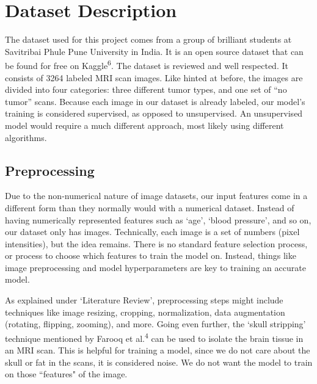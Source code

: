 \documentclass[conference]{IEEEtran}
\begin{document}
\section{\large Dataset Description}

The dataset used for this project comes from a group of brilliant students at Savitribai Phule Pune University in India. It is an open source dataset that can be found for free on Kaggle\textsuperscript{6}. The dataset is reviewed and well respected. It consists of 3264 labeled MRI scan images. Like hinted at before, the images are divided into four categories: three different tumor types, and one set of “no tumor” scans. Because each image in our dataset is already labeled, our model's training is considered supervised, as opposed to unsupervised. An unsupervised model would require a much different approach, most likely using different algorithms.

\subsection{\large Preprocessing}

Due to the non-numerical nature of image datasets, our input features come in a different form than they normally would with a numerical dataset. Instead of having numerically represented features such as `age', `blood pressure', and so on, our dataset only has images. Technically, each image is a set of numbers (pixel intensities), but the idea remains. There is no standard feature selection process, or process to choose which features to train the model on. Instead, things like image preprocessing and model hyperparameters are key to training an accurate model.

As explained under `Literature Review', preprocessing steps might include techniques like image resizing, cropping, normalization, data augmentation (rotating, flipping, zooming), and more. Going even further, the `skull stripping' technique mentioned by Farooq et al.\textsuperscript{4} can be used to isolate the brain tissue in an MRI scan. This is helpful for training a model, since we do not care about the skull or fat in the scans, it is considered noise. We do not want the model to train on those ``features" of the image.
\end{document}
